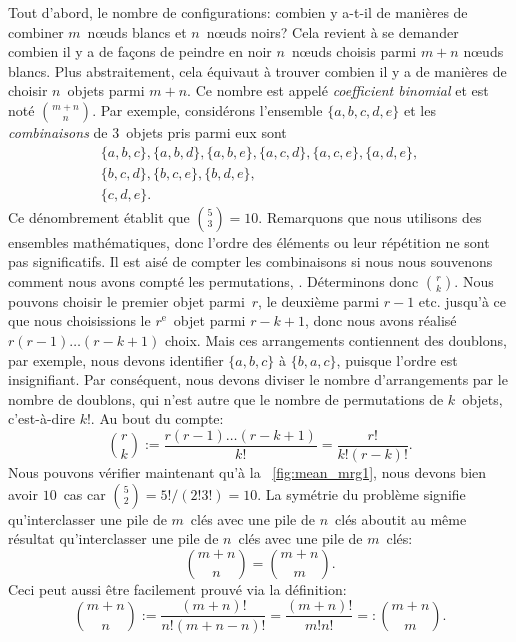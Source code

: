 Tout d'abord, le nombre de configurations: combien y a-t-il de
manières de combiner \(m\)~n{\oe}uds blancs et \(n\)~n{\oe}uds noirs?
Cela revient à se demander combien il y a de façons de peindre en noir
\(n\)~n{\oe}uds choisis parmi \(m+n\) n{\oe}uds blancs. Plus
abstraitement, cela équivaut à trouver combien il y a de manières de
choisir \(n\)~objets parmi \(m+n\). Ce nombre est appelé
\emph{coefficient binomial} et est noté
\(\binom{m+n}{n}\). Par exemple, considérons l'ensemble
\(\{a,b,c,d,e\}\) et les \emph{combinaisons} de
\(3\)~objets pris parmi eux sont
\begin{gather*}
\{a,b,c\},\{a,b,d\},\{a,b,e\},\{a,c,d\},\{a,c,e\},\{a,d,e\},\\
\{b,c,d\},\{b,c,e\},\{b,d,e\},\\
\{c,d,e\}.
\end{gather*}
Ce dénombrement établit que \(\binom{5}{3} = 10\). Remarquons que nous
utilisons des ensembles mathématiques, donc l'ordre des éléments ou
leur répétition ne sont pas significatifs. Il est aisé de compter les
combinaisons si nous nous souvenons comment nous avons compté les
permutations, . Déterminons donc
\(\binom{r}{k}\). Nous pouvons choisir le premier objet parmi~\(r\),
le deuxième parmi \(r-1\) etc. jusqu'à ce que nous choisissions le
\(r^\text{e}\)~objet parmi \(r-k+1\), donc nous avons réalisé
\(r(r-1)\dots(r-k+1)\) choix. Mais ces arrangements contiennent des
doublons, par exemple, nous devons identifier \(\{a,b,c\}\) à
\(\{b,a,c\}\), puisque l'ordre est insignifiant. Par conséquent, nous
devons diviser le nombre d'arrangements par le nombre de doublons, qui
n'est autre que le nombre de permutations de \(k\)~objets,
c'est-à-dire \(k!\). Au bout du compte:
\begin{equation*}
\binom{r}{k} := \frac{r(r-1)\ldots(r-k+1)}{k!} =
\frac{r!}{k!(r-k)!}.
\end{equation*}
Nous pouvons vérifier maintenant qu'à la \fig~\vref{fig:mean_mrg1},
nous devons bien avoir \(10\)~cas car \(\binom{5}{2} = 5!/(2!3!) =
10\). La symétrie du problème signifie qu'interclasser une pile de
\(m\)~clés avec une pile de \(n\)~clés aboutit au même résultat
qu'interclasser une pile de \(n\)~clés avec une pile de \(m\)~clés:
\begin{equation*}
\binom{m+n}{n} = \binom{m+n}{m}.
\end{equation*}
Ceci peut aussi être facilement prouvé via la définition:
\begin{equation*}
\binom{m+n}{n} := \frac{(m+n)!}{n!(m+n-n)!} =
\frac{(m+n)!}{m!n!} =: \binom{m+n}{m}.
\end{equation*}
